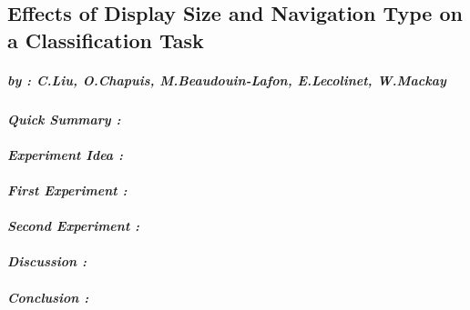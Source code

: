 \subsection*{Effects of Display Size and Navigation Type on a Classification Task}
    \subparagraph{by : C.Liu, O.Chapuis, M.Beaudouin-Lafon, E.Lecolinet, W.Mackay}
    \cite{liu2014effects}
    \paragraph{ \textit{Quick Summary :} 
                \newline
                \indent \indent \textnormal{} }
    
    \paragraph{ \textit{Experiment Idea :} 
                \newline
                \indent \indent \textnormal{} }

    \paragraph{ \textit{First Experiment :} 
                \newline
                \indent \indent \textnormal{} }

    \paragraph{ \textit{Second Experiment :} 
                \newline
                \indent \indent \textnormal{} }

    \paragraph{ \textit{Discussion :}
                \newline
                \indent \indent \textnormal{} }
                
    \paragraph{ \textit{Conclusion :}
                \newline
                \indent \indent \textnormal{} }